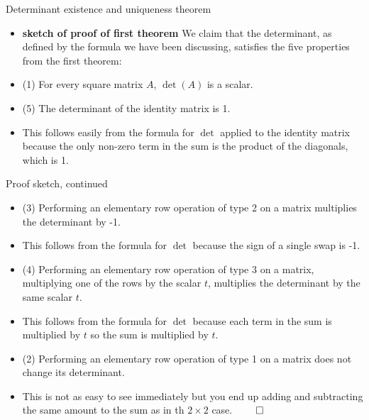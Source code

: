 \documentclass[handout]{beamer}
\begin{document}

\begin{frame}{Determinant existence and uniqueness theorem}

\begin{itemize}
\item \textbf{sketch of proof of first theorem} We claim that the determinant, as defined by the formula we have
been discussing, satisfies the five properties from the first theorem:
\item (1) For every square matrix $A$, $\det(A)$ is a scalar.
\item (5) The determinant of the identity matrix is 1.
\item This follows easily from the formula for $\det$ applied to the identity matrix because the only non-zero term in the
sum is the product of the diagonals, which is 1.
\end{itemize}
\end{frame}


\begin{frame}{Proof sketch, continued}

\begin{itemize}
\item (3) Performing an elementary row operation of type 2 on a matrix multiplies the determinant by -1.
\item This follows from the formula for $\det$ because the sign of a single swap is -1.
\item (4) Performing an elementary row operation of type 3 on a matrix, multiplying one of the rows by the scalar $t$,
multiplies the determinant by the same scalar $t$.
\item This follows from the formula for $\det$ because each term in the sum is multiplied by $t$ so the sum is multiplied by $t$.
\item (2) Performing an elementary row operation of type 1 on a matrix does not change its determinant.
\item This is not as easy to see immediately but you end up adding and subtracting the same amount to the sum as in
th $2\times 2$ case. $\qed$
\end{itemize}
\end{frame}

\end{document}
